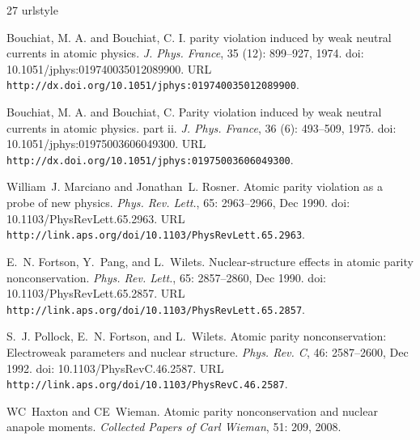 \documentclass[%
 reprint,
 amsmath,amssymb,
 aps,
]{revtex4-1}
\begin{document}
\begin{thebibliography}{27}
\providecommand{\natexlab}[1]{#1}
\providecommand{\url}[1]{\texttt{#1}}
\expandafter\ifx\csname urlstyle\endcsname\relax
  \providecommand{\doi}[1]{doi: #1}\else
  \providecommand{\doi}{doi: \begingroup \urlstyle{rm}\Url}\fi

{Bouchiat, M. A.} and {Bouchiat, C.}
\newblock I. parity violation induced by weak neutral currents in atomic
  physics.
\newblock \emph{J. Phys. France}, 35 (12): 899--927, 1974.
\newblock \doi{10.1051/jphys:019740035012089900}.
\newblock URL \url{http://dx.doi.org/10.1051/jphys:019740035012089900}.

{Bouchiat, M. A.} and {Bouchiat, C.}
\newblock Parity violation induced by weak neutral currents in atomic physics.
  part ii.
\newblock \emph{J. Phys. France}, 36 (6): 493--509, 1975.
\newblock \doi{10.1051/jphys:01975003606049300}.
\newblock URL \url{http://dx.doi.org/10.1051/jphys:01975003606049300}.

William~J. Marciano and Jonathan~L. Rosner.
\newblock Atomic parity violation as a probe of new physics.
\newblock \emph{Phys. Rev. Lett.}, 65: 2963--2966, Dec 1990.
\newblock \doi{10.1103/PhysRevLett.65.2963}.
\newblock URL \url{http://link.aps.org/doi/10.1103/PhysRevLett.65.2963}.

E.~N. Fortson, Y.~Pang, and L.~Wilets.
\newblock Nuclear-structure effects in atomic parity nonconservation.
\newblock \emph{Phys. Rev. Lett.}, 65: 2857--2860, Dec 1990.
\newblock \doi{10.1103/PhysRevLett.65.2857}.
\newblock URL \url{http://link.aps.org/doi/10.1103/PhysRevLett.65.2857}.

S.~J. Pollock, E.~N. Fortson, and L.~Wilets.
\newblock Atomic parity nonconservation: Electroweak parameters and nuclear
  structure.
\newblock \emph{Phys. Rev. C}, 46: 2587--2600, Dec 1992.
\newblock \doi{10.1103/PhysRevC.46.2587}.
\newblock URL \url{http://link.aps.org/doi/10.1103/PhysRevC.46.2587}.

WC~Haxton and CE~Wieman.
\newblock Atomic parity nonconservation and nuclear anapole moments.
\newblock \emph{Collected Papers of Carl Wieman}, 51: 209, 2008.


\end{thebibliography}
\end{document}
